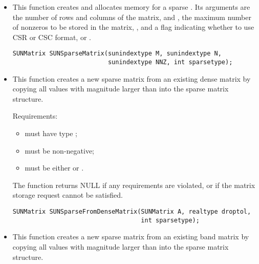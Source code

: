 \begin{itemize}


\item {}

  This function creates and allocates memory for a sparse .
  Its arguments are the number of rows and columns of the
  matrix,  and , the maximum number of nonzeros to be
  stored in the matrix, , and a flag indicating whether to use
  CSR or CSC format,  or .

  \begin{verbatim}
SUNMatrix SUNSparseMatrix(sunindextype M, sunindextype N,
                          sunindextype NNZ, int sparsetype);
  \end{verbatim}


\item {}

  This function creates a new sparse matrix from an existing dense
  matrix by copying all values with magnitude larger than 
  into the sparse matrix structure.

  Requirements:
  \begin{itemize}
  \item {} must have type ;
  \item {} must be non-negative;
  \item {} must be either  or .
  \end{itemize}
  The function returns NULL if any requirements are violated, or if
  the matrix storage request cannot be satisfied. 

  \begin{verbatim}
SUNMatrix SUNSparseFromDenseMatrix(SUNMatrix A, realtype droptol,
                                   int sparsetype);
  \end{verbatim}


\item {}

  This function creates a new sparse matrix from an existing band
  matrix by copying all values with magnitude larger than 
  into the sparse matrix structure.


\end{itemize}
